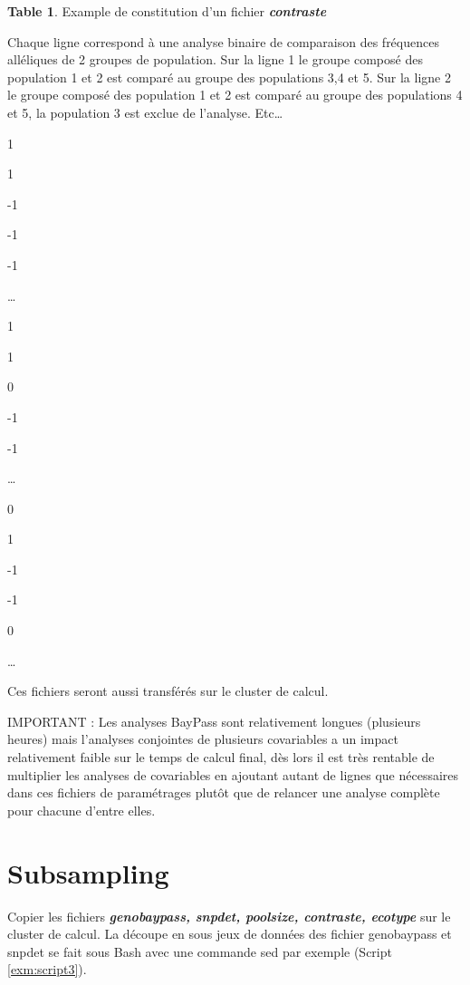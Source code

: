 \documentclass[
  openany]{book}
\theoremstyle{definition}
\newtheorem{definition}{Table}[chapter]
\theoremstyle{definition}
\theoremstyle{definition}
\theoremstyle{definition}
\theoremstyle{remark}
\begin{document}
\begin{definition}
\protect\hypertarget{def:table2}{}\label{def:table2}{Example de constitution d'un fichier \textbf{\emph{contraste}}}
\end{definition}

Chaque ligne correspond à une analyse binaire de comparaison des fréquences alléliques de 2 groupes de population.
Sur la ligne 1 le groupe composé des population 1 et 2 est comparé au groupe des populations 3,4 et 5.
Sur la ligne 2 le groupe composé des population 1 et 2 est comparé au groupe des populations 4 et 5, la population 3 est exclue de l'analyse.
Etc\ldots{}

1

1

-1

-1

-1

\ldots{}

1

1

0

-1

-1

\ldots{}

0

1

-1

-1

0

\ldots{}

Ces fichiers seront aussi transférés sur le cluster de calcul.

IMPORTANT : Les analyses BayPass sont relativement longues (plusieurs heures) mais l'analyses conjointes de plusieurs covariables a un impact relativement faible sur le temps de calcul final, dès lors il est très rentable de multiplier les analyses de covariables en ajoutant autant de lignes que nécessaires dans ces fichiers de paramétrages plutôt que de relancer une analyse complète pour chacune d'entre elles.

\hypertarget{subsampling}{%
\section*{Subsampling}\label{subsampling}}

Copier les fichiers \textbf{\emph{genobaypass, snpdet, poolsize, contraste, ecotype}} sur le cluster de calcul.
La découpe en sous jeux de données des fichier genobaypass et snpdet se fait sous Bash avec une commande sed par exemple (Script \ref{exm:script3}).
\end{document}
